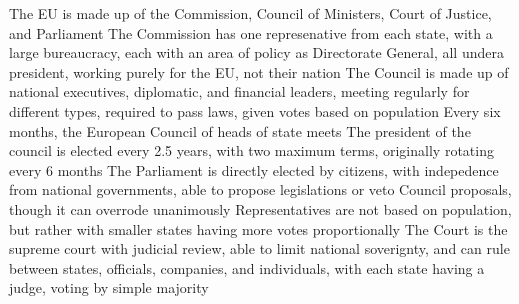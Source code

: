 \documentclass[11 pt, twoside]{article}
\newenvironment{outline*}
{
	\begin{outline}[enumerate]
	}
	{\end{outline}
}
\begin{document}
\begin{outline*}
\1 The EU is made up of the Commission, Council of Ministers, Court of Justice, and Parliament
\2 The Commission has one represenative from each state, with a large bureaucracy, each with an area of policy as Directorate General, all undera  president, working purely for the EU, not their nation
\2 The Council is made up of national executives, diplomatic, and financial leaders, meeting regularly for different types, required to pass laws, given votes based on population
\3 Every six months, the European Council of heads of state meets
\3 The president of the council is elected every 2.5 years, with two maximum terms, originally rotating every 6 months
\2 The Parliament is directly elected by citizens, with indepedence from national governments, able to propose legislations or veto Council proposals, though it can overrode unanimously
\3 Representatives are not based on population, but rather with smaller states having more votes proportionally
\2 The Court is the supreme court with judicial review, able to limit national soverignty, and can rule between states, officials, companies, and individuals, with each state having a judge, voting by simple majority
\end{outline*}
\end{document}
